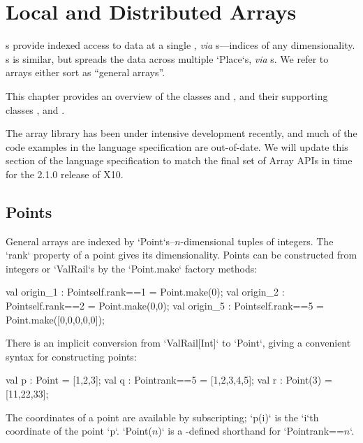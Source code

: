 \chapter{Local and Distributed Arrays}\label{XtenArrays}

s provide indexed access to data at a single , {\em via}
s---indices of any dimensionality. s is similar, but
spreads the data across multiple \xcd`Place`s, {\em via} s.  
We refer to arrays either sort as ``general arrays''.  


This chapter provides an overview of the  classes 
and , and their supporting classes , 
and .  

The array library has been under intensive development recently, and
much of the code examples in the language specification are
out-of-date.  We will update this section of the language specification
to match the final set of Array APIs in time for the 2.1.0 release of X10.


\section{Points}\label{point-syntax}

General arrays are indexed by \xcd`Point`s--$n$-dimensional tuples of
integers.  The \xcd`rank`
property of a point gives its dimensionality.  Points can be constructed from
integers or \xcd`ValRail`s by
the \xcd`Point.make` factory methods:
\begin{xten}
val origin_1 : Point{self.rank==1} = Point.make(0);
val origin_2 : Point{self.rank==2} = Point.make(0,0);
val origin_5 : Point{self.rank==5} = Point.make([0,0,0,0,0]);
\end{xten}

There is an implicit conversion from \xcd`ValRail[Int]` to 
\xcd`Point`, giving
a convenient syntax for constructing points: 

\begin{xten}
val p : Point = [1,2,3];
val q : Point{rank==5} = [1,2,3,4,5];
val r : Point(3) = [11,22,33];
\end{xten}

The coordinates of a point are available by subscripting; \xcd`p(i)` is the
\xcd`i`th coordinate of the point \xcd`p`. 
\xcdmath`Point($n$)` is a -defined shorthand  for 
\xcdmath`Point{rank==$n$}`.


